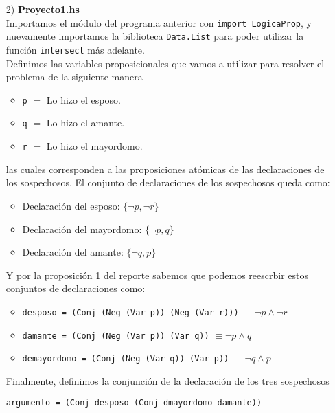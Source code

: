 \documentclass[letterpaper,12pt]{article}
\begin{document}
\begin{itemize}
        \item[2)] \textbf{Proyecto1.hs} \\
        Importamos el módulo del programa anterior con 
        \texttt{import LogicaProp}, y nuevamente importamos la biblioteca 
        \texttt{Data.List} para poder utilizar la función \texttt{intersect}
        más adelante. \\
        Definimos las variables proposicionales que vamos a utilizar para 
        resolver el problema de la siguiente manera
        \begin{itemize}
            \item \texttt{p} $=$ Lo hizo el esposo.
            \item \texttt{q} $=$ Lo hizo el amante.
            \item \texttt{r} $=$ Lo hizo el mayordomo.
        \end{itemize}

        las cuales corresponden a las proposiciones atómicas de las 
        declaraciones de los sospechosos. El conjunto de declaraciones 
        de los sospechosos queda como: 
        \begin{itemize}
            \item Declaración del esposo: $\{ \neg p, \neg r \}$
            \item Declaración del mayordomo: $\{ \neg p, q \}$
            \item Declaración del amante: $\{\neg q, p \}$
        \end{itemize}

        Y por la proposición 1 del reporte sabemos que podemos reescrbir
        estos conjuntos de declaraciones como:

        \begin{itemize}
            \item \texttt{desposo = (Conj (Neg (Var p)) (Neg (Var r)))}
            $\equiv \neg p \land \neg r$
            \item \texttt{damante = (Conj (Neg (Var p)) (Var q))}
            $\equiv \neg p \land q$
            \item \texttt{demayordomo = (Conj (Neg (Var q)) (Var p))}
            $\equiv \neg q \land p$
        \end{itemize}

        Finalmente, definimos la conjunción de la declaración de los tres 
        sospechosos
        \begin{center}
            \texttt{argumento = (Conj desposo (Conj dmayordomo damante))}
        \end{center}


\end{itemize}
\end{document}
